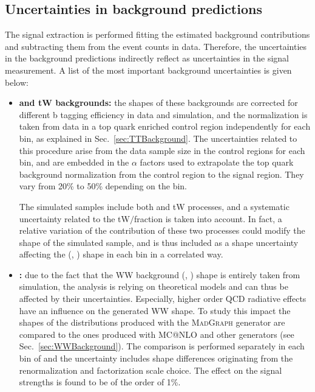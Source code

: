 \subsection{Uncertainties in background predictions}

The signal extraction is performed fitting the estimated background contributions and subtracting them from the event counts in data. Therefore, the uncertainties in the background predictions indirectly reflect as uncertainties in the signal measurement. A list of the most important background uncertainties is given below:

\begin{itemize}
\item {\bf\boldmath \ttbar and tW backgrounds:}    
the shapes of these backgrounds are corrected for different b tagging efficiency in data and simulation, and the normalization is taken from data in a top quark enriched control region independently for each \pth bin, as explained in Sec.~\ref{sec:TTBackground}. The uncertainties related to this procedure arise from the data sample size in the control regions for each \pth bin, and are embedded in the $\alpha$ factors used to extrapolate the top quark background normalization from the control region to the signal region. They vary from 20\% to 50\% depending on the \pth bin.
 
The simulated samples include both \ttbar and tW processes, and a systematic uncertainty related to the tW$/$\ttbar fraction is taken into account.
In fact, a relative variation of the contribution of these two processes could modify the shape of the simulated sample, and is thus included as a shape uncertainty affecting the (\mll, \mt) shape in each \pth bin in a correlated way. 

\item {\bf {}:} 
due to the fact that the WW background (\mll, \mt) shape is entirely taken from simulation, the analysis is relying on theoretical models and can thus be affected by their uncertainties. Especially, higher order QCD radiative effects have an influence on the generated WW shape. To study this impact the shapes of the distributions produced with the \textsc{MadGraph} generator are compared to the ones produced with \textsc{MC@NLO} and other generators (see Sec.~\ref{sec:WWBackground}). The comparison is performed separately in each bin of \pth and the uncertainty includes shape differences originating from the renormalization and factorization scale choice. The effect on the signal strengths is found to be of the order of 1\%.
  

\end{itemize}
